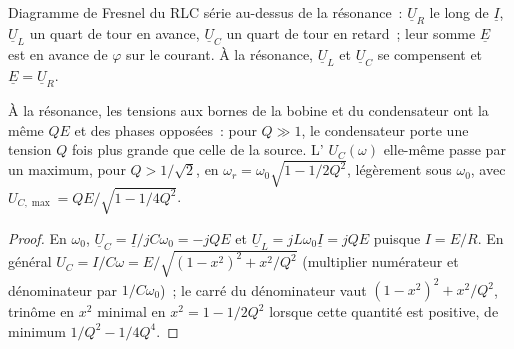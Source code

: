 \begin{omfigure}

{\small Diagramme de Fresnel du RLC série au-dessus de la résonance~:
$\underline U_R$ le long de $\underline I$, $\underline U_L$ un quart de
tour en avance, $\underline U_C$ un quart de tour en retard~; leur somme
$\underline E$ est en avance de $\varphi$ sur le courant. À la
résonance, $\underline U_L$ et $\underline U_C$ se compensent et
$\underline E = \underline U_R$.}
\end{omfigure}

\begin{proposition}[Surtension]\label{prop:b1:sinusoidal-impedance:overvoltage}
À la résonance, les tensions aux bornes de la bobine et du condensateur
ont la même  $QE$ et des phases opposées~: pour $Q \gg 1$, le
condensateur porte une tension $Q$ fois plus grande que celle de la
source. L' $U_C(\omega)$ elle-même passe par un maximum, pour
$Q > 1/\sqrt2$, en $\omega_r =
\omega_0\sqrt{1 - 1/2Q^2}$, légèrement sous $\omega_0$, avec
$U_{C,\max} = QE/\sqrt{1 - 1/4Q^2}$.
\end{proposition}

\begin{proof}
En $\omega_0$, $\underline U_C = \underline I/jC\omega_0 = -jQE$ et
$\underline U_L = jL\omega_0\underline I = jQE$ puisque $I = E/R$. En
général $U_C = I/C\omega = E/\sqrt{(1 - x^2)^2 + x^2/Q^2}$ (multiplier
numérateur et dénominateur par $1/C\omega_0$)~; le carré du dénominateur
vaut $(1 - x^2)^2 + x^2/Q^2$, trinôme en $x^2$ minimal en $x^2 =
1 - 1/2Q^2$ lorsque cette quantité est positive, de minimum $1/Q^2 - 1/4Q^4$.
\end{proof}

